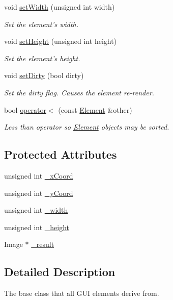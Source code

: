 \begin{DoxyCompactItemize}
void \hyperlink{class_element_a185f979ca317ede0dd270c7940b2a0a2}{set\-Width} (unsigned int width)
\begin{DoxyCompactList}\small\item\em Set the element's width. \end{DoxyCompactList}\item 
void \hyperlink{class_element_aa3aaacaf56fb94deaa14f6b0d172ab65}{set\-Height} (unsigned int height)
\begin{DoxyCompactList}\small\item\em Set the element's height. \end{DoxyCompactList}\item 
void \hyperlink{class_element_aee4a1536e9e19eec9970522bb664550d}{set\-Dirty} (bool dirty)
\begin{DoxyCompactList}\small\item\em Set the dirty flag. Causes the element re-\/render. \end{DoxyCompactList}\item 
bool \hyperlink{class_element_aa931ea96e0f488ffe00b7bef715ef24c}{operator$<$} (const \hyperlink{class_element}{Element} \&other)
\begin{DoxyCompactList}\small\item\em Less than operator so \hyperlink{class_element}{Element} objects may be sorted. \end{DoxyCompactList}\end{DoxyCompactItemize}
\subsection*{Protected Attributes}
\begin{DoxyCompactItemize}
\item 
unsigned int \hyperlink{class_element_a53e4a4ffd5e4e60ce40f55f910d11f23}{\-\_\-x\-Coord}
\item 
unsigned int \hyperlink{class_element_ab7215197a138c164d0ab07d7632e2ef2}{\-\_\-y\-Coord}
\item 
unsigned int \hyperlink{class_element_a559a2b7894e65668aee75346a3976f86}{\-\_\-width}
\item 
unsigned int \hyperlink{class_element_a6118137bfca71319ebaaa0d87be60cf3}{\-\_\-height}
\item 
Image $\ast$ \hyperlink{class_element_ac79e1d8bac0f2b6d23f9ae156d4b6cce}{\-\_\-result}
\end{DoxyCompactItemize}


\subsection{Detailed Description}
The base class that all G\-U\-I elements derive from. 

